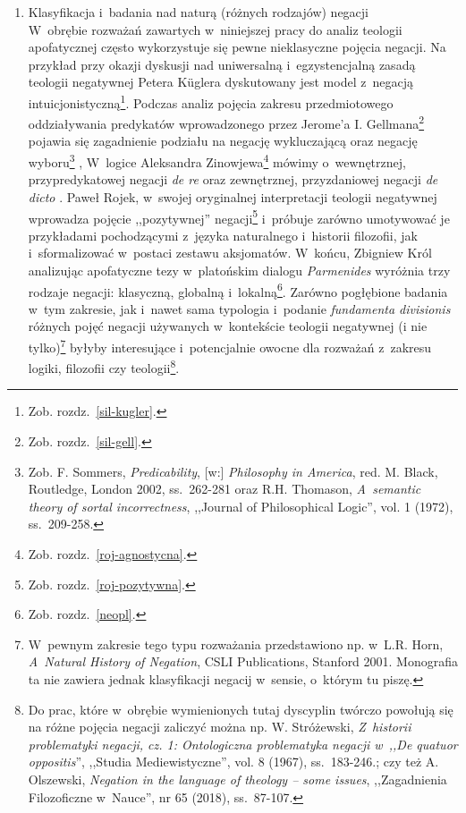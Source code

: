 \begin{enumerate}[label = \arabic*), itemindent=6mm, labelwidth=4mm, labelsep=2mm, itemsep=1em, leftmargin=0mm]
\item Klasyfikacja i~badania nad naturą (różnych rodzajów) negacji\\
W~obrębie rozważań zawartych w~niniejszej pracy do analiz teologii apofatycznej często wykorzystuje się pewne nieklasyczne pojęcia negacji. Na przykład przy okazji dyskusji nad uniwersalną i~egzystencjalną zasadą teologii negatywnej Petera Küglera dyskutowany jest model z~negacją intuicjonistyczną\footnote{Zob. rozdz.~\ref{sil-kugler}.}. Podczas analiz pojęcia zakresu przedmiotowego oddziaływania predykatów wprowadzonego przez Jerome'a I. Gellmana\footnote{Zob. rozdz.~\ref{sil-gell}.} pojawia się zagadnienie podziału na negację wykluczającą oraz negację wyboru\footnote{Zob. F. Sommers, \textit{Predicability}, [w:] \textit{Philosophy in America}, red. M. Black, Routledge, London 2002, ss.~262-281 oraz R.H. Thomason, \textit{A~semantic theory of sortal incorrectness}, ,,Journal of Philosophical Logic'', vol. 1 (1972), ss.~209-258.} , W~logice Aleksandra Zinowjewa\footnote{Zob. rozdz.~\ref{roj-agnostycna}.} mówimy o~wewnętrznej, przypredykatowej negacji \textit{de re} oraz zewnętrznej, przyzdaniowej negacji \textit{de dicto}
. Paweł Rojek, w~swojej oryginalnej interpretacji teologii negatywnej wprowadza pojęcie ,,pozytywnej'' negacji\footnote{Zob. rozdz.~\ref{roj-pozytywna}.} i~próbuje zarówno umotywować je przykładami pochodzącymi z~języka naturalnego i~historii filozofii, jak i~sformalizować w~postaci zestawu aksjomatów. W~końcu, Zbigniew Król analizując apofatyczne tezy w~platońskim dialogu \textit{Parmenides} wyróżnia trzy rodzaje negacji: klasyczną, globalną i~lokalną\footnote{Zob. rozdz.~\ref{neopl}.}. Zarówno pogłębione badania w~tym zakresie, jak i~nawet sama typologia i~podanie \textit{fundamenta divisionis} różnych pojęć negacji używanych w~kontekście teologii negatywnej (i nie tylko)\footnote{W~pewnym zakresie tego typu rozważania przedstawiono np. w~L.R. Horn, \textit{A~Natural History of Negation}, CSLI Publications, Stanford 2001. Monografia ta nie zawiera jednak klasyfikacji negacij w~sensie, o~którym tu piszę.} byłyby interesujące i~potencjalnie owocne dla rozważań z~zakresu logiki, filozofii czy teologii\footnote{Do prac, które w~obrębie wymienionych tutaj dyscyplin twórczo powołują się na różne pojęcia negacji zaliczyć można np. W. Stróżewski, \textit{Z~historii problematyki negacji, cz. 1: Ontologiczna problematyka negacji w~,,De quatuor oppositis}'', ,,Studia Mediewistyczne'', vol. 8 (1967), ss.~183-246.; czy też A. Olszewski, \textit{Negation in the language of theology -- some issues}, ,,Zagadnienia Filozoficzne w~Nauce'', nr 65 (2018), ss.~87-107.}.


\end{enumerate}
